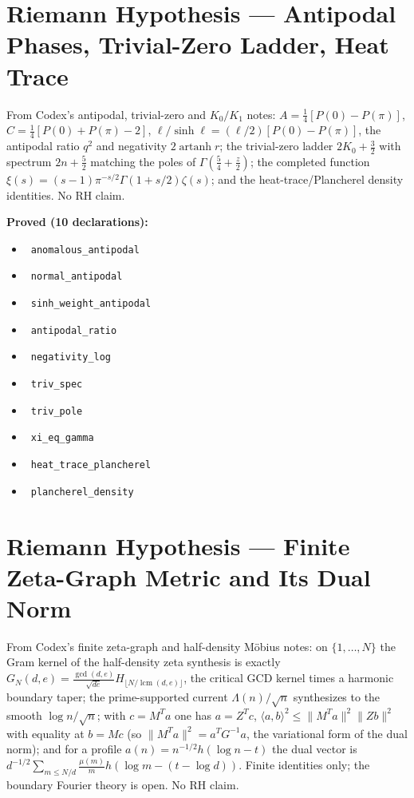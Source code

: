 \documentclass{report}
\theoremstyle{definition}
\begin{document}
\section{Riemann Hypothesis --- Antipodal Phases, Trivial-Zero Ladder, Heat Trace}
From Codex's antipodal, trivial-zero and $K_0/K_1$ notes: $A=\tfrac14[P(0)-P(\pi)]$, $C=\tfrac14[P(0)+P(\pi)-2]$, $\ell/\sinh\ell=(\ell/2)[P(0)-P(\pi)]$, the antipodal ratio $q^2$ and negativity $2\operatorname{artanh}r$; the trivial-zero ladder $2K_0+\tfrac32$ with spectrum $2n+\tfrac52$ matching the poles of $\Gamma(\tfrac54+\tfrac z2)$; the completed function $\xi(s)=(s-1)\pi^{-s/2}\Gamma(1+s/2)\zeta(s)$; and the heat-trace/Plancherel density identities. No RH claim.

\noindent\textbf{Proved (10 declarations):}
\begin{itemize}
  \item {}\leanok\ \texttt{anomalous\_antipodal}
  \item {}\leanok\ \texttt{normal\_antipodal}
  \item {}\leanok\ \texttt{sinh\_weight\_antipodal}
  \item {}\leanok\ \texttt{antipodal\_ratio}
  \item {}\leanok\ \texttt{negativity\_log}
  \item {}\leanok\ \texttt{triv\_spec}
  \item {}\leanok\ \texttt{triv\_pole}
  \item {}\leanok\ \texttt{xi\_eq\_gamma}
  \item {}\leanok\ \texttt{heat\_trace\_plancherel}
  \item {}\leanok\ \texttt{plancherel\_density}
\end{itemize}

\section{Riemann Hypothesis --- Finite Zeta-Graph Metric and Its Dual Norm}
From Codex's finite zeta-graph and half-density M\"obius notes: on $\{1,\dots,N\}$ the Gram kernel of the half-density zeta synthesis is exactly $G_N(d,e)=\frac{\gcd(d,e)}{\sqrt{de}}H_{\lfloor N/\operatorname{lcm}(d,e)\rfloor}$, the critical GCD kernel times a harmonic boundary taper; the prime-supported current $\Lambda(n)/\sqrt n$ synthesizes to the smooth $\log n/\sqrt n$; with $c=M^Ta$ one has $a=Z^Tc$, $\langle a,b\rangle^2\le\|M^Ta\|^2\|Zb\|^2$ with equality at $b=Mc$ (so $\|M^Ta\|^2=a^TG^{-1}a$, the variational form of the dual norm); and for a profile $a(n)=n^{-1/2}h(\log n-t)$ the dual vector is $d^{-1/2}\sum_{m\le N/d}\frac{\mu(m)}{m}h(\log m-(t-\log d))$. Finite identities only; the boundary Fourier theory is open. No RH claim.
\end{document}
